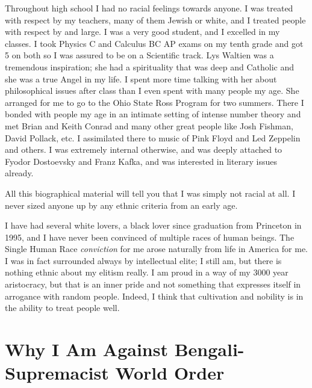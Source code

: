 \documentclass{amsart}
\begin{document}
Throughout high school I had no racial feelings towards anyone.  I was treated with respect by my teachers, many of them Jewish or white, and I treated people with respect by and large.  I was a very good student, and I excelled in my classes.  I took Physics C and Calculus BC AP exams on my tenth grade and got 5 on both so I was assured to be on a Scientific track.  Lys Waltien was a tremendous inspiration; she had a spirituality that was deep and Catholic and she was a true Angel in my life.  I spent more time talking with her about philosophical issues after class than I even spent with many people my age.  She arranged for me to go to the Ohio State Ross Program for two summers.  There I bonded with people my age in an intimate setting of intense number theory and met Brian and Keith Conrad and many other great people like Josh Fishman, David Pollack, etc.  I assimilated there to music of Pink Floyd and Led Zeppelin and others.  I was extremely internal otherwise, and was deeply attached to Fyodor Dostoevsky and Franz Kafka, and was interested in literary issues already.  

All this biographical material will tell you that I was simply not racial at all.  I never sized anyone up by any ethnic criteria from an early age.  

I have had several white lovers, a black lover since graduation from Princeton in 1995, and I have never been convinced of multiple races of human beings.  The Single Human Race {\em conviction} for me arose naturally from life in America for me.  I was in fact surrounded always by intellectual elite; I still am, but there is nothing ethnic about my elitism really.  I am proud in a way of my 3000 year aristocracy, but that is an inner pride and not something that expresses itself in arrogance with random people.  Indeed, I think that cultivation and nobility is in the ability to treat people well.

\section{Why I Am Against Bengali-Supremacist World Order}
\end{document}
